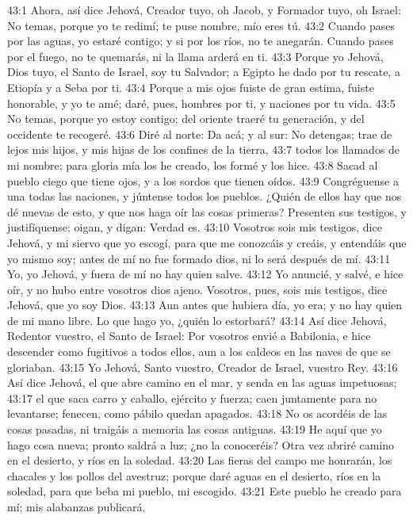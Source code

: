 43:1 Ahora, así dice Jehová, Creador tuyo, oh Jacob, y Formador tuyo, oh Israel: No temas, porque yo te redimí; te puse nombre, mío eres tú.  
43:2 Cuando pases por las aguas, yo estaré contigo; y si por los ríos, no te anegarán. Cuando pases por el fuego, no te quemarás, ni la llama arderá en ti.  
43:3 Porque yo Jehová, Dios tuyo, el Santo de Israel, soy tu Salvador; a Egipto he dado por tu rescate, a Etiopía y a Seba por ti.  
43:4 Porque a mis ojos fuiste de gran estima, fuiste honorable, y yo te amé; daré, pues, hombres por ti, y naciones por tu vida.  
43:5 No temas, porque yo estoy contigo; del oriente traeré tu generación, y del occidente te recogeré.  
43:6 Diré al norte: Da acá; y al sur: No detengas; trae de lejos mis hijos, y mis hijas de los confines de la tierra,  
43:7 todos los llamados de mi nombre; para gloria mía los he creado, los formé y los hice.  
43:8 Sacad al pueblo ciego que tiene ojos, y a los sordos que tienen oídos.  
43:9 Congréguense a una todas las naciones, y júntense todos los pueblos. ¿Quién de ellos hay que nos dé nuevas de esto, y que nos haga oír las cosas primeras? Presenten sus testigos, y justifíquense; oigan, y digan: Verdad es.  
43:10 Vosotros sois mis testigos, dice Jehová, y mi siervo que yo escogí, para que me conozcáis y creáis, y entendáis que yo mismo soy; antes de mí no fue formado dios, ni lo será después de mí.  
43:11 Yo, yo Jehová, y fuera de mí no hay quien salve.  
43:12 Yo anuncié, y salvé, e hice oír, y no hubo entre vosotros dios ajeno. Vosotros, pues, sois mis testigos, dice Jehová, que yo soy Dios.  
43:13 Aun antes que hubiera día, yo era; y no hay quien de mi mano libre. Lo que hago yo, ¿quién lo estorbará?  
43:14 Así dice Jehová, Redentor vuestro, el Santo de Israel: Por vosotros envié a Babilonia, e hice descender como fugitivos a todos ellos, aun a los caldeos en las naves de que se gloriaban.  
43:15 Yo Jehová, Santo vuestro, Creador de Israel, vuestro Rey.  
43:16 Así dice Jehová, el que abre camino en el mar, y senda en las aguas impetuosas;  
43:17 el que saca carro y caballo, ejército y fuerza; caen juntamente para no levantarse; fenecen, como pábilo quedan apagados.  
43:18 No os acordéis de las cosas pasadas, ni traigáis a memoria las cosas antiguas.  
43:19 He aquí que yo hago cosa nueva; pronto saldrá a luz; ¿no la conoceréis? Otra vez abriré camino en el desierto, y ríos en la soledad.  
43:20 Las fieras del campo me honrarán, los chacales y los pollos del avestruz; porque daré aguas en el desierto, ríos en la soledad, para que beba mi pueblo, mi escogido.  
43:21 Este pueblo he creado para mí; mis alabanzas publicará.  
